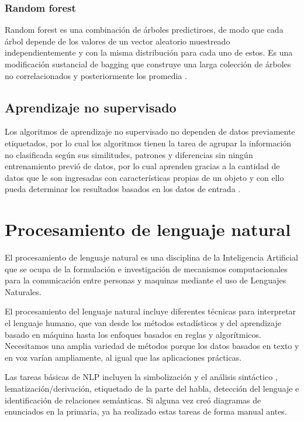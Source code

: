 \subsubsection{Random forest}
Random forest es una combinación de árboles predictiroes, de modo que cada árbol depende de los valores de un vector 
aleatorio muestreado independientemente y con la misma distribución para cada uno de estos. Es una modificación sustancial de bagging que construye una 
larga colección de árboles no correlacionados y posteriormente los promedia \citep{CT9}.

\subsection{Aprendizaje no supervisado}
Los algoritmos de aprendizaje no supervisado no dependen de datos previamente etiquetados, por lo cual los algoritmos 
tienen la tarea de agrupar la información no clasificada según sus similitudes, patrones y diferencias sin ningún entrenamiento 
previó de datos, por lo cual aprenden gracias a la cantidad de datos que le son ingresadas con características propias de un 
objeto y con ello pueda determinar los resultados basados en los datos de entrada \citep{CT10}.

\section{Procesamiento de lenguaje natural}
El procesamiento de lenguaje natural es una disciplina de la Inteligencia Artificial que se ocupa de la formulación e 
investigación de mecanismos computacionales para la comunicación entre personas y maquinas mediante el uso de Lenguajes 
Naturales.

El procesamiento del lenguaje natural incluye diferentes técnicas para interpretar el lenguaje humano, que van desde los métodos 
estadísticos y del aprendizaje basado en máquina hasta los enfoques basados en reglas y algorítmicos. Necesitamos una amplia variedad 
de métodos porque los datos basados en texto y en voz varían ampliamente, al igual que las aplicaciones prácticas. 

Las tareas básicas de NLP incluyen la simbolización y el análisis sintáctico , lematización/derivación, etiquetado de la parte del 
habla, detección del lenguaje e identificación de relaciones semánticas. Si alguna vez creó diagramas de enunciados en la primaria, 
ya ha realizado estas tareas de forma manual antes. 

